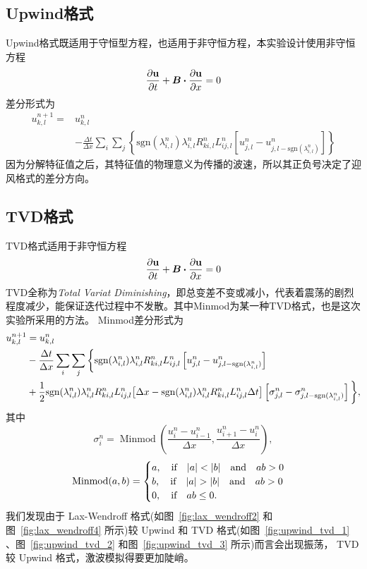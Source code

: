 \documentclass[10.5pt
]{article}
\begin{document}
\subsection{Upwind格式}
Upwind格式既适用于守恒型方程，也适用于非守恒方程，本实验设计使用非守恒方程
\begin{align}
\pdv{\vb u}{t} + \vb*B \vdot \pdv{\vb u}{x} = 0
\end{align}
差分形式为
\begin{align}
u_{k,l}^{n+1} =& u_{k,l}^n \nonumber\\
& - \frac{\Delta t}{\Delta x} \sum_i \sum_j \left\{\text{sgn}(\lambda_{i,l}^n)
 \lambda_{i,l}^n R_{ki,l}^n L_{ij,l}^n \left[u_{j,l}^n - u_{j,l-\text{sgn}(\lambda_{i,l}^n)}^n\right]\right\}
\end{align}
因为分解特征值之后，其特征值的物理意义为传播的波速，所以其正负号决定了迎风格式的差分方向。

\subsection{TVD格式}
TVD格式适用于非守恒方程
\begin{align}
\pdv{\vb u}{t} + \vb*B \vdot \pdv{\vb u}{x} = 0
\end{align}
TVD全称为\textit{Total Variat Diminishing}，即总变差不变或减小，代表着震荡的剧烈程度减少，能保证迭代过程中不发散。其中Minmod为某一种TVD格式，也是这次实验所采用的方法。
Minmod差分形式为
\begin{equation}
\begin{aligned}
u_{k,l}^{n+1} &= u_{k,l}^n \\
& - \frac{\Delta t}{\Delta x} \sum_i \sum_j \bigg\{\text{sgn}(\lambda_{i,l}^n)
 \lambda_{i,l}^n R_{ki,l}^n L_{ij,l}^n \left[u_{j,l}^n - u_{j,l-\text{sgn}(\lambda_{i,l}^n)}^n\right]\\
& + \frac{1}{2}
\text{sgn}(\lambda_{i,l}^n) \lambda_{i,l}^n R_{ki,l}^n L_{ij,l}^n
	\qty[\Delta x-\text{sgn}(\lambda_{i,l}^n) \lambda_{i,l}^n R_{ki,l}^n L_{ij,l}^n \Delta t]
 \left[\sigma_{j,l}^n - \sigma_{j,l-\text{sgn}(\lambda_{i,l}^n)}^n\right]\bigg\},
\end{aligned}
\end{equation}
其中
\begin{equation}
	\sigma_i^n = \operatorname{Minmod} \left( \frac{u_i^n - u_{i-1}^{n}}{ \Delta x }, \frac{u_{i+1}^n - u_{i}^{n}}{ \Delta x } \right),
\end{equation}
\begin{equation}
	\operatorname{Minmod}(a, b) = 
	\begin{cases}
		a, \qif |a| < |b| \qand ab > 0\\
		b, \qif |a| > |b| \qand ab > 0\\
		0, \qif ab \leq 0.
	\end{cases}
\end{equation}
我们发现由于 Lax-Wendroff 格式(如图~\ref{fig:lax_wendroff2} 和图~\ref{fig:lax_wendroff4} 所示)较 Upwind 和 TVD 格式(如图~\ref{fig:upwind_tvd_1} 、图~\ref{fig:upwind_tvd_2} 和图~\ref{fig:upwind_tvd_3} 所示)而言会出现振荡，
TVD 较 Upwind 格式，激波模拟得要更加陡峭。
\end{document}
